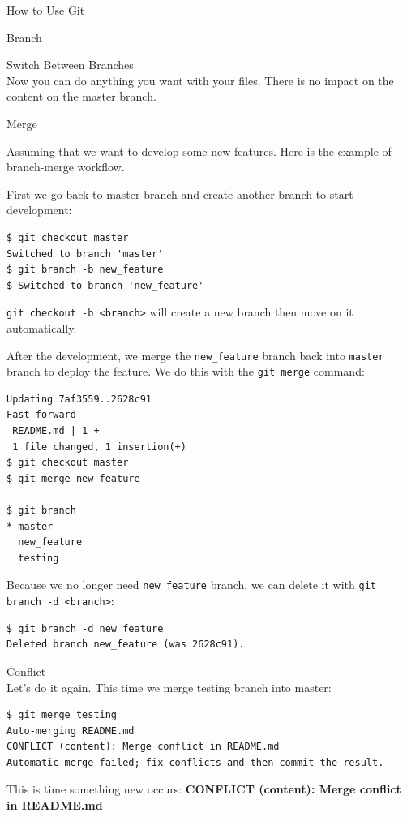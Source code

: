 \documentclass[12pt, a4papaer]{article}
\begin{document}
\begin{section}{How to Use Git}
\begin{subsection}{Branch}
\begin{paragraph}{Switch Between Branches\\}
Now you can do anything you want with your files. There is no impact on the content
on the master branch.
\end{paragraph}

\begin{paragraph}{Merge\\}

Assuming that we want to develop some new features. Here is the example of
branch-merge workflow.

First we go back to master branch and create another branch to start development:

\begin{lstlisting}
$ git checkout master
Switched to branch 'master'
$ git branch -b new_feature
$ Switched to branch 'new_feature'
\end{lstlisting}

\verb|git checkout -b <branch>| will create a new branch then move on it automatically.

After the development, we merge the \verb|new_feature| branch back into 
\verb|master| branch to deploy the feature. We do this with the \verb|git merge|
command:

\begin{lstlisting}
Updating 7af3559..2628c91
Fast-forward
 README.md | 1 +
 1 file changed, 1 insertion(+)
$ git checkout master
$ git merge new_feature

$ git branch
* master
  new_feature
  testing
\end{lstlisting}

Because we no longer need \verb|new_feature| branch, we can delete it with
\verb|git branch -d <branch>|:

\begin{lstlisting}
$ git branch -d new_feature
Deleted branch new_feature (was 2628c91).
\end{lstlisting}
\end{paragraph}

\begin{paragraph}{Conflict\\}
Let's do it again. This time we merge testing branch into master:

\begin{lstlisting}
$ git merge testing
Auto-merging README.md
CONFLICT (content): Merge conflict in README.md
Automatic merge failed; fix conflicts and then commit the result.
\end{lstlisting}

This is time something new occurs: \textbf{CONFLICT (content): Merge conflict in README.md}


\end{paragraph}
\end{subsection}
\end{section}
\end{document}
